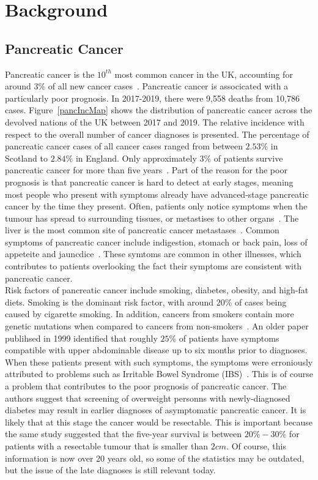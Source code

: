 \chapter{Background}\label{backChap}

\section{Pancreatic Cancer}
Pancreatic cancer is the $10^{th}$ most common cancer in the UK, accounting for around $3\%$ of all new cancer cases~\cite{pancStat}. Pancreatic cancer is associcated with a particularly poor prognosis. In 2017-2019, there were 9,558 deaths from 10,786 cases. Figure~\ref{pancIncMap} shows the distribution of pancreatic cancer across the devolved nations of the UK between 2017 and 2019. The relative incidence with respect to the overall number of cancer diagnoses is presented. The percentage of pancreatic cancer cases of all cancer cases ranged from between $2.53\%$ in Scotland to $2.84\%$ in England. Only approximately $3\%$ of patients survive pancreatic cancer for more than five years~\cite{NG85}. Part of the reason for the poor prognosis is that pancreatic cancer is hard to detect at early stages, meaning most people who present with symptoms already have advanced-stage pancreatic cancer by the time they present. Often, patients only notice symptoms when the tumour has spread to surrounding tissues, or metastises to other organs~\cite{kelsen}. The liver is the most common site of pancreatic cancer metastases~\cite{deeb}. Common symptoms of pancreatic cancer include indigestion, stomach or back pain, loss of appeteite and jauncdice~\cite{pancSymp}. These symtoms are common in other illnesses, which contributes to patients overlooking the fact their symptoms are consistent with pancreatic cancer. \\

Risk factors of pancreatic cancer include smoking, diabetes, obesity, and high-fat diets. Smoking is the dominant risk factor, with around $20\%$ of cases being caused by cigarette smoking. In addition, cancers from smokers contain more genetic mutations when compared to cancers from non-smokers~\cite{blackford}. An older paper publihsed in 1999 identified that roughly $25\%$ of patients have symptoms compatible with upper abdominable disease up to six months prior to diagnoses. When these patients present with such symptoms, the symptoms were erroniously attributed to problems such as Irritable Bowel Syndrome (IBS)~\cite{dimagno}. This is of course a problem that contributes to the poor prognosis of pancreatic cancer. The authors suggest that screening of overweight personns with newly-diagnosed diabetes may result in earlier diagnoses of asymptomatic pancreatic cancer. It is likely that at this stage the cancer would be resectable. This is important because the same study suggested that the five-year survival is between $20\%-30\%$ for patients with a resectable tumour that is smaller than $2cm$. Of course, this information is now over 20 years old, so some of the statistics may be outdated, but the issue of the late diagnoses is still relevant today. \\

